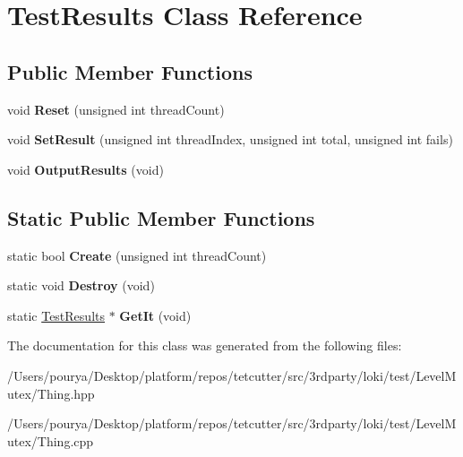 \hypertarget{classTestResults}{}\section{Test\+Results Class Reference}
\label{classTestResults}
\subsection*{Public Member Functions}
\begin{DoxyCompactItemize}
\item 
\hypertarget{classTestResults_a4d438ab089abc8183cd0cc4fe17278ec}{}void {\bfseries Reset} (unsigned int thread\+Count)\label{classTestResults_a4d438ab089abc8183cd0cc4fe17278ec}

\item 
\hypertarget{classTestResults_aa78e01785f226b819025f121baca1949}{}void {\bfseries Set\+Result} (unsigned int thread\+Index, unsigned int total, unsigned int fails)\label{classTestResults_aa78e01785f226b819025f121baca1949}

\item 
\hypertarget{classTestResults_a82bf22fc6546c9e3f29985ad2a21280f}{}void {\bfseries Output\+Results} (void)\label{classTestResults_a82bf22fc6546c9e3f29985ad2a21280f}

\end{DoxyCompactItemize}
\subsection*{Static Public Member Functions}
\begin{DoxyCompactItemize}
\item 
\hypertarget{classTestResults_a939662e47b7471e7c9b8d05573b36835}{}static bool {\bfseries Create} (unsigned int thread\+Count)\label{classTestResults_a939662e47b7471e7c9b8d05573b36835}

\item 
\hypertarget{classTestResults_a93fd1e565c14a74d71e6dd3a5d045f42}{}static void {\bfseries Destroy} (void)\label{classTestResults_a93fd1e565c14a74d71e6dd3a5d045f42}

\item 
\hypertarget{classTestResults_af0561521584d7a9a765f38ed371e5eed}{}static \hyperlink{classTestResults}{Test\+Results} $\ast$ {\bfseries Get\+It} (void)\label{classTestResults_af0561521584d7a9a765f38ed371e5eed}

\end{DoxyCompactItemize}


The documentation for this class was generated from the following files\+:\begin{DoxyCompactItemize}
\item 
/\+Users/pourya/\+Desktop/platform/repos/tetcutter/src/3rdparty/loki/test/\+Level\+Mutex/Thing.\+hpp\item 
/\+Users/pourya/\+Desktop/platform/repos/tetcutter/src/3rdparty/loki/test/\+Level\+Mutex/Thing.\+cpp\end{DoxyCompactItemize}
